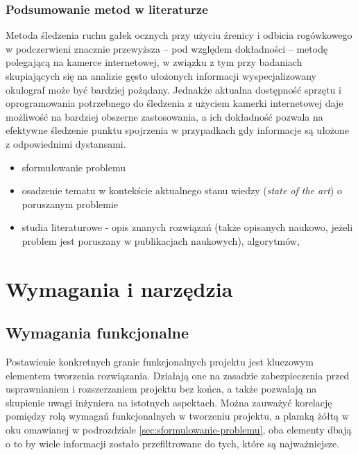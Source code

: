 \documentclass[a4paper,twoside,12pt]{book}
\newcommand{\obcy}[1]{\emph{#1}}
\newcommand{\english}[1]{{\selectlanguage{british}\obcy{#1}}}
\begin{document}
\subsection{Podsumowanie metod w literaturze}
\label{subsec:Podsumowanie-metod-w-literaturze}

Metoda śledzenia ruchu gałek ocznych przy użyciu źrenicy i odbicia rogówkowego w podczerwieni znacznie przewyższa -- pod względem dokładności -- metodę polegającą na kamerce internetowej, w związku z tym przy badaniach skupiających się na analizie gęsto ułożonych informacji wyspecjalizowany okulograf może być bardziej pożądany. Jednakże aktualna dostępność sprzętu i oprogramowania potrzebnego do śledzenia z użyciem kamerki internetowej daje możliwość na bardziej obszerne zastosowania, a ich dokładność pozwala na efektywne śledzenie punktu spojrzenia w przypadkach gdy informacje są ułożone z odpowiednimi dystansami.





\begin{itemize}
\item sformułowanie problemu
\item osadzenie tematu w kontekście aktualnego stanu wiedzy (\english{state of the art}) o poruszanym problemie
\item  studia literaturowe \cite{bib:artykul,bib:ksiazka,bib:konferencja,bib:internet} -  opis znanych rozwiązań (także opisanych naukowo, jeżeli problem jest poruszany w publikacjach naukowych), algorytmów, 
\end{itemize}







%
%
%
\chapter{Wymagania i narzędzia}
\label{ch:wymagania-i-narzedzia}

\section{Wymagania funkcjonalne}
\label{sec:wymagania-funkcjonalne}

Postawienie konkretnych granic funkcjonalnych projektu jest kluczowym elementem tworzenia rozwiązania. Działają one na zasadzie zabezpieczenia przed usprawnianiem i rozszerzaniem projektu bez końca, a także pozwalają na skupienie uwagi inżyniera na istotnych aspektach. Można zauważyć korelację pomiędzy rolą wymagań funkcjonalnych w tworzeniu projektu, a plamką żółtą w oku omawianej w podrozdziale \ref{sec:sformulowanie-problemu}, oba elementy dbają o to by wiele informacji zostało przefiltrowane do tych, które są najważniejsze.
\end{document}
